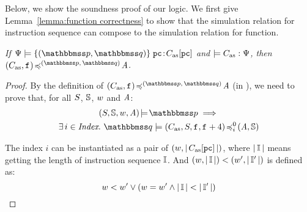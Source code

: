 {\color{blue}
Below, we show the soundness proof of our logic.
We first give Lemma~\ref{lemma:function correctness}
to show that the simulation relation for instruction
sequence can compose to the simulation relation for
function.
\begin{lemma}
    \label{lemma:function correctness}
    \em
    If $\semwffseqrel{\Cspec{}}{\relastP}{\relastQ}
            {\pc}{\asmimp[\pc]}$ and
    $\models C_{\text{as}}:\Psi{}$, then
    $\simFunction{(\asmimp, \lab{})}
        {(\relastP, \, \relastQ)}{\primcom}$.
\end{lemma}
\begin{proof}
    By the definition of
    $\simFunction{(\asmimp, \lab{})}
        {(\relastP, \, \relastQ)}{\primcom}$
    (in \Def{\ref{def:simfunc}}),
    we need to prove that, for all $S$, $\mathbb{S}$,
    $w$ and $\textit{A}$:
    \begin{multline*}
        \asrtmodel{(\state, \hpstate, \word, \primcom)}
            {\relastP} \implies \\
            \exists \, i \in \Index. \
            \simFunctionSt{\relastQ}{(\asmimp, \state, \lab{}, \lab{}+4)}
                {i}{0}{(\primcom, \hpstate)}
    \end{multline*}

    The index $i$ can be instantiated as a pair of
    $(w, |\,C_{\text{as}}[\texttt{pc}]\,|)$, where $|\,\mathbb{I}\,|$ means
    getting the length of instruction sequence $\mathbb{I}$.
    And $(w, |\, \mathbb{I} \,|) < (w', |\,\mathbb{I}'\,|)$
    is defined as:
    \[
        w < w' \lor
        (w = w' \land
        |\,\mathbb{I}\,| < |\,\mathbb{I}'\,|)
    \]


\end{proof}}
